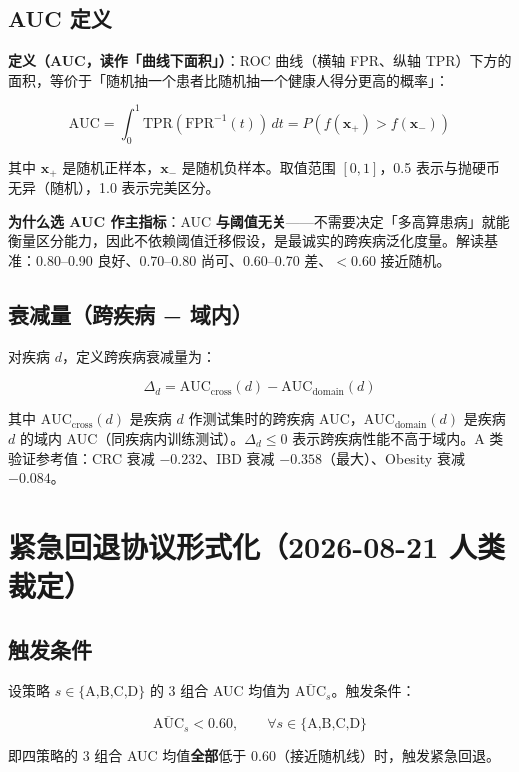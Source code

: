 \documentclass{internal-report}
\begin{document}
\subsection{AUC 定义}

\textbf{定义（AUC，读作「曲线下面积」）}：ROC 曲线（横轴 FPR、纵轴 TPR）下方的面积，等价于「随机抽一个患者比随机抽一个健康人得分更高的概率」：

$$
\text{AUC} = \int_0^1 \text{TPR}\!\left(\text{FPR}^{-1}(t)\right)\, dt = P\!\left(f(\mathbf{x}_+) > f(\mathbf{x}_-)\right)
$$

其中 $\mathbf{x}_+$ 是随机正样本，$\mathbf{x}_-$ 是随机负样本。取值范围 $[0,1]$，0.5 表示与抛硬币无异（随机），1.0 表示完美区分。

\textbf{为什么选 AUC 作主指标}：AUC \textbf{与阈值无关}——不需要决定「多高算患病」就能衡量区分能力，因此不依赖阈值迁移假设，是最诚实的跨疾病泛化度量。解读基准：0.80--0.90 良好、0.70--0.80 尚可、0.60--0.70 差、$<0.60$ 接近随机。

\subsection{衰减量（跨疾病 − 域内）}

对疾病 $d$，定义跨疾病衰减量为：

$$
\Delta_d = \text{AUC}_{\text{cross}}(d) - \text{AUC}_{\text{domain}}(d)
$$

其中 $\text{AUC}_{\text{cross}}(d)$ 是疾病 $d$ 作测试集时的跨疾病 AUC，$\text{AUC}_{\text{domain}}(d)$ 是疾病 $d$ 的域内 AUC（同疾病内训练测试）。$\Delta_d\le 0$ 表示跨疾病性能不高于域内。A 类验证参考值：CRC 衰减 $-0.232$、IBD 衰减 $-0.358$（最大）、Obesity 衰减 $-0.084$。

\section{紧急回退协议形式化（2026-08-21 人类裁定）}

\subsection{触发条件}

设策略 $s\in\{\text{A,B,C,D}\}$ 的 3 组合 AUC 均值为 $\overline{\text{AUC}}_s$。触发条件：

$$
\overline{\text{AUC}}_s < 0.60, \qquad \forall s\in\{\text{A,B,C,D}\}
$$

即四策略的 3 组合 AUC 均值\textbf{全部}低于 0.60（接近随机线）时，触发紧急回退。
\end{document}
